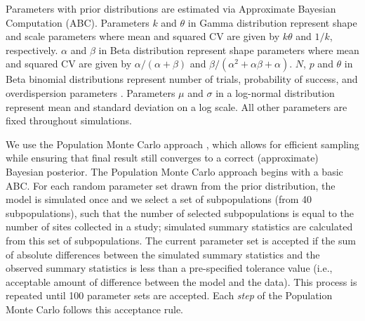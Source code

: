 \documentclass{article}\usepackage[]{graphicx}\usepackage[]{color}
\begin{document}
{\begin{landscape}
\begin{table}[h]
{Parameters with prior distributions are estimated via Approximate Bayesian Computation (ABC).
Parameters $k$ and $\theta$ in Gamma distribution represent shape and scale parameters where mean and squared CV are given by $k \theta$ and $1/k$, respectively.
$\alpha$ and $\beta$ in Beta distribution represent shape parameters where mean and squared CV are given by $\alpha/(\alpha+\beta)$ and $\beta/(\alpha^2 + \alpha \beta + \alpha)$.
$N$, $p$ and $\theta$ in Beta binomial distributions represent number of trials, probability of success, and overdispersion parameters \citep{morris1983natural}.
Parameters $\mu$ and $\sigma$ in a log-normal distribution represent mean and standard deviation on a log scale.
All other parameters are fixed throughout simulations.
}
\label{tb:param}
\end{table}
\end{landscape}
}

We use the Population Monte Carlo approach \citep{turner2012tutorial}, which allows for efficient sampling while ensuring that final result still converges to a correct (approximate) Bayesian posterior.
The Population Monte Carlo approach begins with a basic ABC.
For each random parameter set drawn from the prior distribution, the model is simulated once and
we select a set of subpopulations (from 40 subpopulations), such that the number of selected subpopulations is
equal to the number of sites collected in a study;
simulated summary statistics are calculated from this set of subpopulations.
The current parameter set is accepted if the sum of absolute differences between the simulated summary statistics and the observed summary statistics is less than a pre-specified tolerance value (i.e., acceptable amount of difference between the model and the data).
This process is repeated until 100 parameter sets are accepted.
Each \emph{step} of the Population Monte Carlo follows this acceptance rule.
\end{document}
